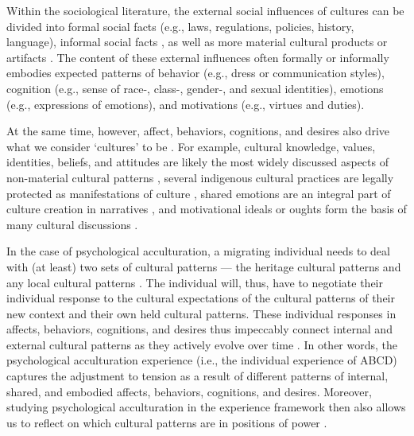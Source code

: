 \documentclass[man, 12pt, a4paper, mask]{apa7}
\begin{document}
Within the sociological literature, the external social influences of cultures can be divided into formal social facts (e.g., laws, regulations, policies, history, language), informal social facts \citep[e.g., norms, values, beliefs, rituals, customs; also see][]{Herzog2018}, as well as more material cultural products or artifacts \citep[e.g., food, fashion, architecture, or arts, such as film, music, literature, and fine arts; e.g., see][]{Alexander2001}. The content of these external influences often formally or informally embodies expected patterns of behavior (e.g., dress or communication styles), cognition (e.g., sense of race-, class-, gender-, and sexual identities), emotions (e.g., expressions of emotions), and motivations (e.g., virtues and duties).

At the same time, however, affect, behaviors, cognitions, and desires also drive what we consider `cultures' to be \citep[e.g.,][]{Varnum2017}. For example, cultural knowledge, values, identities, beliefs, and attitudes are likely the most widely discussed aspects of non-material cultural patterns \citep[i.e., cognitions; e.g.,][]{DiMaggio1997}, several indigenous cultural practices are legally protected as manifestations of culture \citep[i.e., behaviors; e.g., Art. 11][]{UnitedNations2007}, shared emotions are an integral part of culture creation in narratives \citep[i.e., affects; e.g.,][]{Ahmed2014, Kitayama1994, Smith2016c, Sundararajan2015}, and motivational ideals or oughts form the basis of many cultural discussions \citep[i.e., desires; e.g., see][]{Markus1991}.

In the case of psychological acculturation, a migrating individual needs to deal with (at least) two sets of cultural patterns --- the heritage cultural patterns and any local cultural patterns \citep[e.g., see][]{Ferguson2015}. The individual will, thus, have to negotiate their individual response to the cultural expectations of the cultural patterns of their new context and their own held cultural patterns. These individual responses in affects, behaviors, cognitions, and desires thus impeccably connect internal and external cultural patterns as they actively evolve over time \citep[also see the psychological foundations of culture, in][]{adams2004}. In other words, the psychological acculturation experience (i.e., the individual experience of ABCD) captures the adjustment to tension as a result of different patterns of internal, shared, and embodied affects, behaviors, cognitions, and desires. Moreover, studying psychological acculturation in the experience framework then also allows us to reflect on which cultural patterns are in positions of power \citep{Bhatia2001}.
\end{document}
